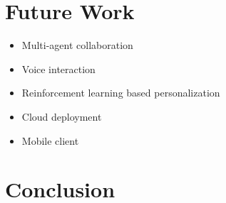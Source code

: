 \documentclass[11pt]{article}
\begin{document}
\section{Future Work}

\begin{itemize}
    \item Multi-agent collaboration
    \item Voice interaction
    \item Reinforcement learning based personalization
    \item Cloud deployment
    \item Mobile client
\end{itemize}

\section{Conclusion}

\end{document}
